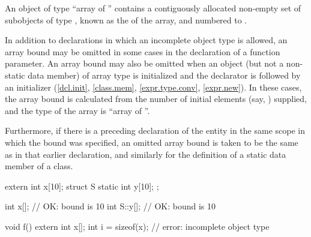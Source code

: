 \pnum
An object of type ``array of  '' contains
a contiguously allocated non-empty set
of  subobjects of type ,
known as the  of the array,
and numbered  to .

\pnum
In addition to declarations in which an incomplete object type is allowed,
an array bound may be omitted in some cases in the declaration of a function
parameter.
An array bound may also be omitted
when an object (but not a non-static data member) of array type is initialized
and the declarator is followed by an initializer
(\ref{dcl.init}, \ref{class.mem}, \ref{expr.type.conv}, \ref{expr.new}).
%
In these cases, the array bound is calculated
from the number of initial elements (say, )
supplied,
and the type of the array is ``array of  ''.

\pnum
Furthermore, if there is a preceding declaration of the entity in the same
scope in which the bound was specified, an omitted array bound is taken to
be the same as in that earlier declaration, and similarly for the definition
of a static data member of a class.
\begin{example}
\begin{codeblock}
extern int x[10];
struct S {
  static int y[10];
};

int x[];                // OK: bound is 10
int S::y[];             // OK: bound is 10

void f() {
  extern int x[];
  int i = sizeof(x);    // error: incomplete object type
}
\end{codeblock}
\end{example}

